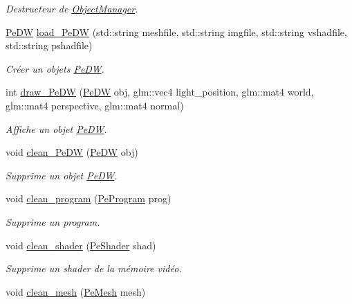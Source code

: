 \begin{DoxyCompactItemize}
\begin{DoxyCompactList}\small\item\em Destructeur de \hyperlink{classPeGL_1_1ObjectManager}{Object\-Manager}. \end{DoxyCompactList}\item 
\hyperlink{structPeGL_1_1PeDW}{Pe\-D\-W} \hyperlink{classPeGL_1_1ObjectManager_a00f736993fcc5e3fb9cf94f86c220f5b}{load\-\_\-\-Pe\-D\-W} (std\-::string meshfile, std\-::string imgfile, std\-::string vshadfile, std\-::string pshadfile)
\begin{DoxyCompactList}\small\item\em Créer un objets \hyperlink{structPeGL_1_1PeDW}{Pe\-D\-W}. \end{DoxyCompactList}\item 
int \hyperlink{classPeGL_1_1ObjectManager_a4955f1a83f99c42df3c767e7d7d37ad6}{draw\-\_\-\-Pe\-D\-W} (\hyperlink{structPeGL_1_1PeDW}{Pe\-D\-W} obj, glm\-::vec4 light\-\_\-position, glm\-::mat4 world, glm\-::mat4 perspective, glm\-::mat4 normal)
\begin{DoxyCompactList}\small\item\em Affiche un objet \hyperlink{structPeGL_1_1PeDW}{Pe\-D\-W}. \end{DoxyCompactList}\item 
void \hyperlink{classPeGL_1_1ObjectManager_a096237714383acd0e374b9d809f1b371}{clean\-\_\-\-Pe\-D\-W} (\hyperlink{structPeGL_1_1PeDW}{Pe\-D\-W} obj)
\begin{DoxyCompactList}\small\item\em Supprime un objet \hyperlink{structPeGL_1_1PeDW}{Pe\-D\-W}. \end{DoxyCompactList}\item 
void \hyperlink{classPeGL_1_1ObjectManager_a4fbd4059906375274afccdbc5632183e}{clean\-\_\-program} (\hyperlink{structPeGL_1_1PeProgram}{Pe\-Program} prog)
\begin{DoxyCompactList}\small\item\em Supprime un program. \end{DoxyCompactList}\item 
void \hyperlink{classPeGL_1_1ObjectManager_a9051bff6bb3fe5f2c686b31ce60eb13f}{clean\-\_\-shader} (\hyperlink{structPeGL_1_1PeShader}{Pe\-Shader} shad)
\begin{DoxyCompactList}\small\item\em Supprime un shader de la mémoire vidéo. \end{DoxyCompactList}\item 
void \hyperlink{classPeGL_1_1ObjectManager_a443b802d78fd1dfc6312fbbaaac7b3ba}{clean\-\_\-mesh} (\hyperlink{structPeGL_1_1PeMesh}{Pe\-Mesh} mesh)

\end{DoxyCompactItemize}
